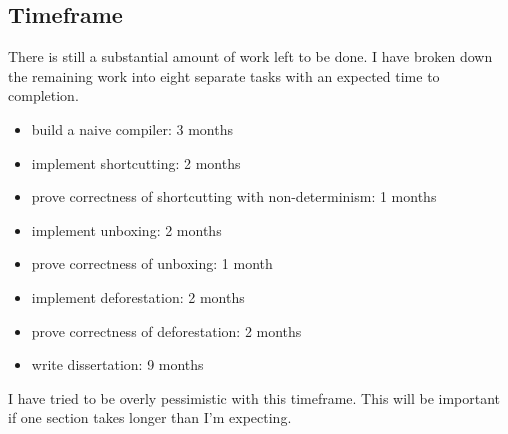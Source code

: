 \subsection{Timeframe}

There is still a substantial amount of work left to be done.
I have broken down the remaining work into eight separate tasks with an expected time to completion.

\begin{itemize}
  \item build a naive compiler: 3 months
  \item implement shortcutting: 2 months
  \item prove correctness of shortcutting with non-determinism: 1 months
  \item implement unboxing: 2 months
  \item prove correctness of unboxing: 1 month
  \item implement deforestation: 2 months
  \item prove correctness of deforestation: 2 months
  \item write dissertation: 9 months
\end{itemize}

I have tried to be overly pessimistic with this timeframe.
This will be important if one section takes longer than I'm expecting.
